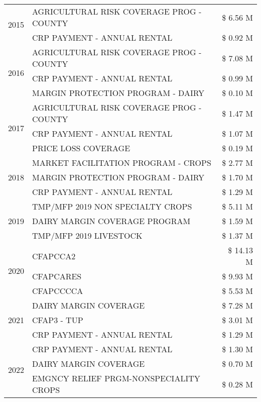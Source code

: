\begin{tabular}{llr}
\cline{1-3}
\multirow[t]{2}{*}{2015} & AGRICULTURAL RISK COVERAGE PROG - COUNTY & \$ 6.56 M \\
 & CRP PAYMENT - ANNUAL RENTAL & \$ 0.92 M \\
\cline{1-3}
\multirow[t]{3}{*}{2016} & AGRICULTURAL RISK COVERAGE PROG - COUNTY & \$ 7.08 M \\
 & CRP PAYMENT - ANNUAL RENTAL & \$ 0.99 M \\
 & MARGIN PROTECTION PROGRAM - DAIRY & \$ 0.10 M \\
\cline{1-3}
\multirow[t]{3}{*}{2017} & AGRICULTURAL RISK COVERAGE PROG - COUNTY & \$ 1.47 M \\
 & CRP PAYMENT - ANNUAL RENTAL & \$ 1.07 M \\
 & PRICE LOSS COVERAGE & \$ 0.19 M \\
\cline{1-3}
\multirow[t]{3}{*}{2018} & MARKET FACILITATION PROGRAM - CROPS & \$ 2.77 M \\
 & MARGIN PROTECTION PROGRAM - DAIRY & \$ 1.70 M \\
 & CRP PAYMENT - ANNUAL RENTAL & \$ 1.29 M \\
\cline{1-3}
\multirow[t]{3}{*}{2019} & TMP/MFP 2019 NON SPECIALTY CROPS & \$ 5.11 M \\
 & DAIRY MARGIN COVERAGE PROGRAM & \$ 1.59 M \\
 & TMP/MFP 2019 LIVESTOCK & \$ 1.37 M \\
\cline{1-3}
\multirow[t]{3}{*}{2020} & CFAPCCA2 & \$ 14.13 M \\
 & CFAPCARES & \$ 9.93 M \\
 & CFAPCCCCA & \$ 5.53 M \\
\cline{1-3}
\multirow[t]{3}{*}{2021} & DAIRY MARGIN COVERAGE & \$ 7.28 M \\
 & CFAP3 - TUP & \$ 3.01 M \\
 & CRP PAYMENT - ANNUAL RENTAL & \$ 1.29 M \\
\cline{1-3}
\multirow[t]{3}{*}{2022} & CRP PAYMENT - ANNUAL RENTAL & \$ 1.30 M \\
 & DAIRY MARGIN COVERAGE & \$ 0.70 M \\
 & EMGNCY RELIEF PRGM-NONSPECIALITY CROPS & \$ 0.28 M \\
\cline{1-3}
\bottomrule
\end{tabular}
